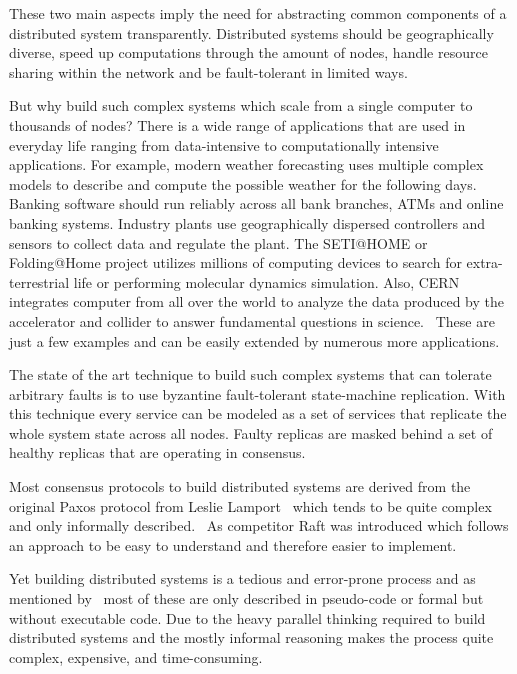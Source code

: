 These two main aspects imply the need for abstracting common components
of a distributed system transparently. Distributed systems should be
geographically diverse, speed up computations through the amount of nodes,
handle resource sharing within the network and be fault-tolerant in limited
ways.

But why build such complex systems which scale from a single computer
to thousands of nodes? There is a wide range of applications that are used in
everyday life ranging from data-intensive to computationally intensive
applications. For example, modern weather forecasting uses multiple complex
models to describe and compute the possible weather for the following days.
Banking software should run reliably across all bank branches, ATMs and
online banking systems. Industry plants use geographically dispersed
controllers and sensors to collect data and regulate the plant.
The SETI@HOME or Folding@Home project utilizes millions of computing devices to search for
extra-terrestrial life or performing molecular dynamics simulation.
Also, CERN integrates computer from all over the world to analyze the data
produced by the accelerator and collider to answer fundamental questions in science.~\cite{ghosh2014distributed}
These are just a few examples and can be easily extended by numerous
more applications.

The state of the art technique to build such complex systems that can
tolerate arbitrary faults is to use byzantine fault-tolerant state-machine
replication. With this technique every service can be modeled as a
set of services that replicate the whole system state across all
nodes. Faulty replicas are masked behind a set of healthy replicas
that are operating in consensus.~\cite{rahli2018velisarios}

Most consensus protocols to build distributed systems are derived from
the original Paxos protocol from Leslie Lamport~\cite{lamport2001paxos}
which tends to be quite complex and only informally
described.~\cite{ongaro2014search}
As competitor Raft was introduced which follows an approach to be
easy to understand and therefore easier to implement.~\cite{ongaro2014consensus}

Yet building distributed systems is a tedious and error-prone process and
as mentioned by~\cite{dragoi2015need} most of these are only
described in pseudo-code or formal but without executable code.
Due to the heavy parallel thinking required to build distributed
systems and the mostly informal reasoning makes the process quite
complex, expensive, and time-consuming.

